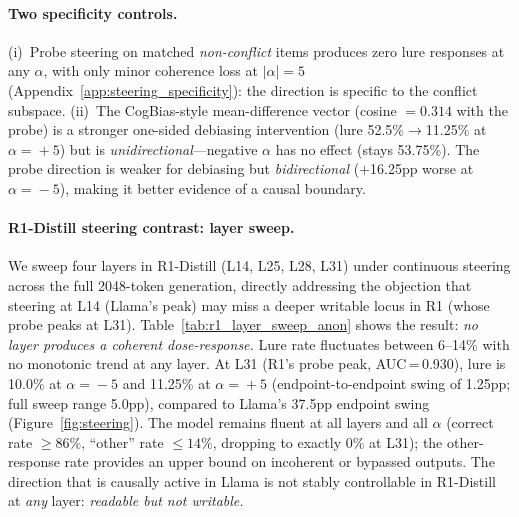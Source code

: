 \documentclass{article}
\begin{document}
\paragraph{Two specificity controls.}
(i)~Probe steering on matched \emph{non-conflict} items produces zero lure responses at any $\alpha$, with only minor coherence loss at $|\alpha|\!=\!5$ (Appendix~\ref{app:steering_specificity}): the direction is specific to the conflict subspace.  (ii)~The CogBias-style mean-difference vector (cosine $= 0.314$ with the probe) is a stronger one-sided debiasing intervention (lure 52.5\%$\to$11.25\% at $\alpha\!=\!+5$) but is \emph{unidirectional}---negative $\alpha$ has no effect (stays 53.75\%).  The probe direction is weaker for debiasing but \emph{bidirectional} ($+$16.25pp worse at $\alpha\!=\!-5$), making it better evidence of a causal boundary.

\paragraph{R1-Distill steering contrast: layer sweep.}
We sweep four layers in R1-Distill (L14, L25, L28, L31) under continuous
steering across the full 2048-token generation, directly addressing the
objection that steering at L14 (Llama's peak) may miss a deeper writable
locus in R1 (whose probe peaks at L31).  Table~\ref{tab:r1_layer_sweep_anon}
shows the result: \emph{no layer produces a coherent dose-response.}
Lure rate fluctuates between 6--14\% with no monotonic trend at any
layer.  At L31 (R1's probe peak, AUC\,=\,0.930), lure is 10.0\% at
$\alpha\!=\!-5$ and 11.25\% at $\alpha\!=\!+5$ (endpoint-to-endpoint
swing of 1.25pp; full sweep range 5.0pp), compared to Llama's 37.5pp
endpoint swing (Figure~\ref{fig:steering}).  The model
remains fluent at all layers and all $\alpha$ (correct rate $\geq 86\%$,
``other'' rate $\leq 14\%$, dropping to exactly 0\% at L31); the other-response rate provides an upper bound on incoherent or bypassed outputs.
The direction that is causally active in Llama is not stably controllable
in R1-Distill at \emph{any} layer: \emph{readable but not writable.}
\end{document}
